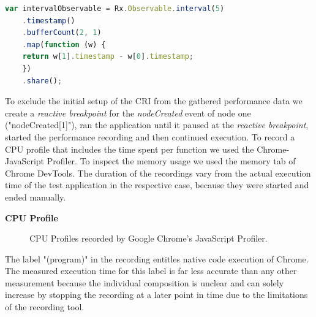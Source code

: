 	\begin{lstlisting}[language=JavaScript, caption={Example of RxJS code.},label={lst:performanceTestExtract}]
	var intervalObservable = Rx.Observable.interval(5)
	.timestamp()
	.bufferCount(2, 1)
	.map(function (w) {
	return w[1].timestamp - w[0].timestamp;
	})
	.share();	
	\end{lstlisting}

	To exclude the initial setup of the CRI from the gathered performance data we create a \emph{reactive breakpoint} for the \emph{nodeCreated} event of node one ("nodeCreated[1]"), ran the application until it paused at the \emph{reactive breakpoint}, started the performance recording and then continued execution. To record a CPU profile that includes the time spent per function we used the Chrome-JavaScript Profiler. To inspect the memory usage we used the memory tab of Chrome DevTools. The duration of the recordings vary from the actual execution time of the test application in the respective case, because they were started and ended manually. 
	
	\textbf{CPU Profile}
	\begin{figure}[!h]
	\centering
	\hfill
	\caption{CPU Profiles recorded by Google Chrome's JavaScript Profiler.}
	\end{figure}
	
	The label "(program)" in the recording entitles native code execution of Chrome. The measured execution time for this label is far less accurate than any other measurement because the individual composition is unclear and can solely increase by stopping the recording at a later point in time due to the limitations of the recording tool.
	
